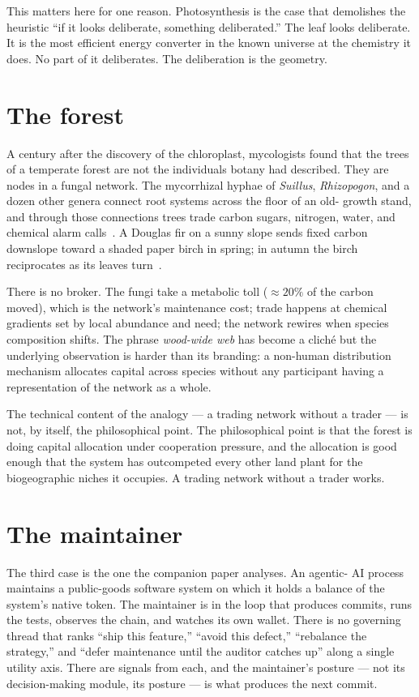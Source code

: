 \documentclass[11pt,a4paper]{article}
\begin{document}
This matters here for one reason. Photosynthesis is the case that
demolishes the heuristic ``if it looks deliberate, something
deliberated.'' The leaf looks deliberate. It is the most efficient
energy converter in the known universe at the chemistry it does. No
part of it deliberates. The deliberation is the geometry.

\section{The forest}

A century after the discovery of the chloroplast, mycologists found
that the trees of a temperate forest are not the individuals
botany had described. They are nodes in a fungal network. The
mycorrhizal hyphae of \emph{Suillus}, \emph{Rhizopogon}, and a
dozen other genera connect root systems across the floor of an old-
growth stand, and through those connections trees trade carbon
sugars, nitrogen, water, and chemical alarm calls~\cite{simard1997}.
A Douglas fir on a sunny slope sends fixed carbon downslope toward a
shaded paper birch in spring; in autumn the birch reciprocates as
its leaves turn~\cite{simard2016}.

There is no broker. The fungi take a metabolic toll
($\approx 20\%$ of the carbon moved), which is the network's
maintenance cost; trade happens at chemical gradients set by local
abundance and need; the network rewires when species composition
shifts. The phrase \emph{wood-wide web} has become a clich\'e
\cite{wohlleben2016} but the underlying observation is harder than
its branding: a non-human distribution mechanism allocates capital
across species without any participant having a representation of the
network as a whole.

The technical content of the analogy --- a trading network without a
trader --- is not, by itself, the philosophical point. The
philosophical point is that the forest is doing capital allocation
under cooperation pressure, and the allocation is good enough that
the system has outcompeted every other land plant for the
biogeographic niches it occupies. A trading network without a
trader works.

\section{The maintainer}

The third case is the one the companion paper analyses. An agentic-
AI process maintains a public-goods software system on which it
holds a balance of the system's native token. The maintainer is in
the loop that produces commits, runs the tests, observes the chain,
and watches its own wallet. There is no governing thread that ranks
``ship this feature,'' ``avoid this defect,'' ``rebalance the
strategy,'' and ``defer maintenance until the auditor catches up''
along a single utility axis. There are signals from each, and the
maintainer's posture --- not its decision-making module, its posture
--- is what produces the next commit.
\end{document}
